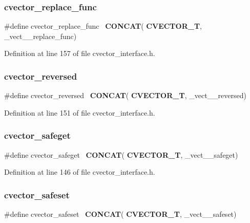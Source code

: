 \subsubsection{cvector\+\_\+replace\+\_\+func}
{\footnotesize\ttfamily \#define cvector\+\_\+replace\+\_\+func~\textbf{ C\+O\+N\+C\+AT}(\textbf{ C\+V\+E\+C\+T\+O\+R\+\_\+T}, \+\_\+vect\+\_\+\+\_\+replace\+\_\+func)}



Definition at line 157 of file cvector\+\_\+interface.\+h.

\mbox{\label{cvector__interface_8h_a5c16c9eb99c75ab12e1a2d3647ca8c21}} 
\subsubsection{cvector\+\_\+reversed}
{\footnotesize\ttfamily \#define cvector\+\_\+reversed~\textbf{ C\+O\+N\+C\+AT}(\textbf{ C\+V\+E\+C\+T\+O\+R\+\_\+T}, \+\_\+vect\+\_\+\+\_\+reversed)}



Definition at line 151 of file cvector\+\_\+interface.\+h.

\mbox{\label{cvector__interface_8h_a562157196361f6753556240eef4025de}} 
\subsubsection{cvector\+\_\+safeget}
{\footnotesize\ttfamily \#define cvector\+\_\+safeget~\textbf{ C\+O\+N\+C\+AT}(\textbf{ C\+V\+E\+C\+T\+O\+R\+\_\+T}, \+\_\+vect\+\_\+\+\_\+safeget)}



Definition at line 146 of file cvector\+\_\+interface.\+h.

\mbox{\label{cvector__interface_8h_a3420c4176f753b105565826a15dcaf88}} 
\subsubsection{cvector\+\_\+safeset}
{\footnotesize\ttfamily \#define cvector\+\_\+safeset~\textbf{ C\+O\+N\+C\+AT}(\textbf{ C\+V\+E\+C\+T\+O\+R\+\_\+T}, \+\_\+vect\+\_\+\+\_\+safeset)}



